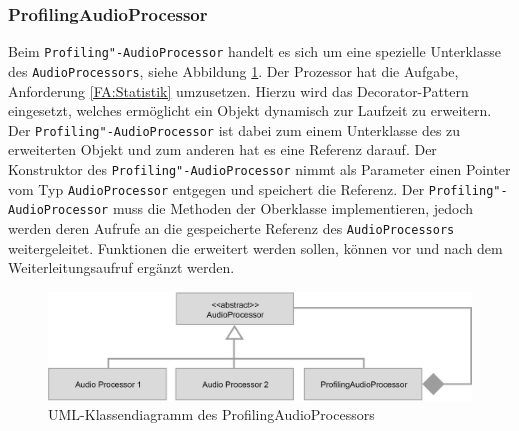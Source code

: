\FloatBarrier




\subsubsection{ProfilingAudioProcessor}
Beim \texttt{Profiling"-AudioProcessor} handelt es sich um eine spezielle Unterklasse des \texttt{AudioProcessors}, siehe Abbildung \ref{Fig:ProfilingAudioProcessor}. Der Prozessor hat die Aufgabe, Anforderung \ref{FA:Statistik} umzusetzen. Hierzu wird das Decorator-Pattern eingesetzt, welches ermöglicht ein Objekt dynamisch zur Laufzeit zu erweitern. Der \texttt{Profiling"-AudioProcessor} ist dabei zum einem Unterklasse des zu erweiterten Objekt und zum anderen hat es eine Referenz darauf. Der Konstruktor des \texttt{Profiling"-AudioProcessor} nimmt als Parameter einen Pointer vom Typ \texttt{AudioProcessor} entgegen und speichert die Referenz. Der \texttt{Profiling"-AudioProcessor} muss die Methoden der Oberklasse implementieren, jedoch werden deren Aufrufe an die gespeicherte Referenz des \texttt{AudioProcessors} weitergeleitet. Funktionen die erweitert werden sollen, können vor und nach dem Weiterleitungsaufruf ergänzt werden.
\newline
\begin{figure}[htp]
\centering
\includegraphics[width=1\textwidth]{../img/ProfilingAudioProcessor}
\caption{UML-Klassendiagramm des ProfilingAudioProcessors}
\label{Fig:ProfilingAudioProcessor}
\end{figure}

\FloatBarrier

